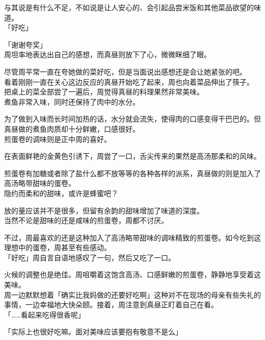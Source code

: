 与其说是有什么不足，不如说是让人安心的、会引起品尝米饭和其他菜品欲望的味道。\\

「好吃」

「谢谢夸奖」\\

周坦率地表达出自己的感想，而真昼则放下了心，微微眯细了眼。

尽管周平常一直在夸她做的菜好吃，但是当面说出感想还是会让她紧张的吧。\\

看着刚刚一直在关心这边反应的真昼开始吃了起来，周也向着菜品伸出了筷子。\\

把桌上的菜全部尝了一遍后，周觉得真昼的料理果然非常美味。\\

煮鱼非常入味，同时还保持了肉中的水分。

为了做到入味而长时间加热的话，水分就会流失，使得肉的口感变得干巴巴的。但真昼做的煮鱼肉质却十分鲜嫩，口感很好。\\

煎蛋卷的调味则是正中周的喜好。

在表面鲜艳的金黄色引诱下，周尝了一口，舌尖传来的果然是高汤那柔和的风味。

煎蛋卷有加糖或者除了盐什么都不放等等的各种各样的派系，真昼做的则是加入了高汤略带甜味的蛋卷。\\

隐约而柔和的甜味，或许是蜂蜜吧？

放的量应该并不是很多，但留有余韵的甜味增加了味道的深度。\\

当然不论是甜味的还是咸味的煎蛋卷，周都不讨厌。

不过，周最喜欢的还是这种加入了高汤略带甜味的调味精致的煎蛋卷。如今吃到这理想中的蛋卷，周甚至有些感动。\\

「好吃」周自言自语地感叹了一句，然后又吃了一口。

火候的调整也是绝佳。周咀嚼着这饱含高汤、口感鲜嫩的煎蛋卷，静静地享受着这美味。\\

周一边默默想着「确实比我妈做的还要好吃啊」这种对不在现场的母亲有些失礼的事情，一边幸福地大快朵颐。接着，周注意到真昼正盯着自己在看。\\

「……看起来吃得很香呢」

「实际上也很好吃嘛。面对美味应该要抱有敬意不是么」

